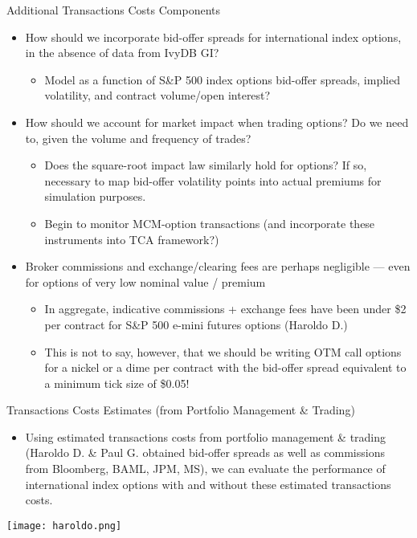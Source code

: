 \documentclass{beamer}
\begin{document}
\begin{frame}{Additional Transactions Costs Components}
\begin{itemize}
\item How should we incorporate bid-offer spreads for international index options, in the absence of data from IvyDB GI?
	\begin{itemize}
	\item Model as a function of S\&P 500 index options bid-offer spreads, implied volatility, and contract volume/open interest?
	\end{itemize}
\vfill
\item How should we account for market impact when trading options? Do we need to, given the volume and frequency of trades?
	\begin{itemize}
	\item Does the square-root impact law similarly hold for options? If so, necessary to map bid-offer volatility points into actual premiums for simulation purposes.
	\item Begin to monitor MCM-option transactions (and incorporate these instruments into TCA framework?)
	\end{itemize}
\vfill
\item Broker commissions and exchange/clearing fees are perhaps negligible --- even for options of very low nominal value / premium
	\begin{itemize}
	\item In aggregate, indicative commissions + exchange fees have been under \$2 per contract for S\&P 500 e-mini futures options (Haroldo D.)
	\item This is not to say, however, that we should be writing OTM call options for a nickel or a dime per contract with the bid-offer spread equivalent to a minimum tick size of \$0.05! 
	\end{itemize}
\vfill
\end{itemize}
\end{frame}

\begin{frame}{\large Transactions Costs Estimates (from Portfolio Management \& Trading)}
\begin{itemize}
\item Using estimated transactions costs from portfolio management \& trading (Haroldo D. \& Paul G. obtained bid-offer spreads as well as commissions from Bloomberg, BAML, JPM, MS), we can evaluate the performance of international index options with and without these estimated transactions costs.
\vfill
\end{itemize}
\texttt{[image: haroldo.png]}
\end{frame}
\end{document}
